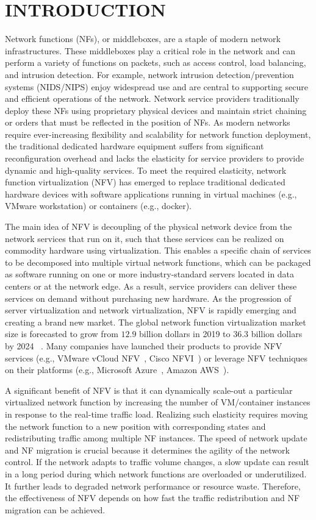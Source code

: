 \chapter{\uppercase{Introduction}}
\label{chap:intro}

Network functions (NFs), or middleboxes, are a staple of modern network infrastructures. These middleboxes play a critical role in the network and can perform a variety of functions on packets, such as access control, load balancing, and intrusion detection. For example, network intrusion detection/prevention systems (NIDS/NIPS) enjoy widespread use and are central to supporting secure and efficient operations of the network. 
Network service providers traditionally deploy these NFs using proprietary physical devices and maintain strict chaining or orders that must be reflected in the position of NFs.
As modern networks require ever-increasing flexibility and scalability for network function deployment, the traditional dedicated hardware equipment suffers from significant reconfiguration overhead and lacks the elasticity for service providers to provide dynamic and high-quality services. To meet the required elasticity, network function virtualization (NFV) has emerged to replace traditional dedicated hardware devices with software applications running in virtual machines (e.g., VMware workstation) or containers (e.g., docker).

The main idea of NFV is decoupling of the physical network device from the network services that run on it, such that these services can be realized on commodity hardware using virtualization. This enables a specific chain of services to be decomposed into multiple virtual network functions, which can be packaged as software running on one or more industry-standard servers located in data centers or at the network edge. As a result, service providers can deliver these services on demand without purchasing new hardware. As the progression of server virtualization and network virtualization, NFV is rapidly emerging and creating a brand new market. The global network function virtualization market size is forecasted to grow from $12.9$ billion dollars in 2019 to $36.3$ billion dollars by 2024 ~\cite{market}. Many companies have launched their products to provide NFV services (e.g., VMware vCloud NFV~\cite{vmware}, Cisco NFVI~\cite{cisco}) or leverage NFV techniques on their platforms (e.g., Microsoft Azure~\cite{azure}, Amazon AWS~\cite{aws}).

A significant benefit of NFV is that it can dynamically scale-out a particular virtualized network function by increasing the number of VM/container instances in response to the real-time traffic load. Realizing such elasticity requires moving the network function to a new position with corresponding states and redistributing traffic among multiple NF instances.
The speed of network update and NF migration is crucial because it determines the agility of the network control. If the network adapts to traffic volume changes, a slow update can result in a long period during which network functions are overloaded or underutilized. It further leads to degraded network performance or resource waste. Therefore, the effectiveness of NFV depends on how fast the traffic redistribution and NF migration can be achieved.

